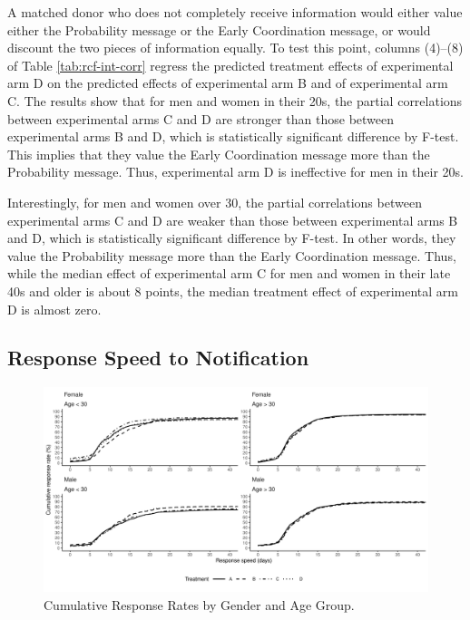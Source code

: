\documentclass[
]{article}
\begin{document}
A matched donor who does not completely receive information would either value either the Probability message or the Early Coordination message, or would discount the two pieces of information equally. To test this point, columns (4)--(8) of Table \ref{tab:rcf-int-corr} regress the predicted treatment effects of experimental arm D on the predicted effects of experimental arm B and of experimental arm C. The results show that for men and women in their 20s, the partial correlations between experimental arms C and D are stronger than those between experimental arms B and D, which is statistically significant difference by F-test. This implies that they value the Early Coordination message more than the Probability message. Thus, experimental arm D is ineffective for men in their 20s.

Interestingly, for men and women over 30, the partial correlations between experimental arms C and D are weaker than those between experimental arms B and D, which is statistically significant difference by F-test. In other words, they value the Probability message more than the Early Coordination message. Thus, while the median effect of experimental arm C for men and women in their late 40s and older is about 8 points, the median treatment effect of experimental arm D is almost zero.

\hypertarget{reply-speed}{%
\subsection{Response Speed to Notification}\label{reply-speed}}

\begin{figure}[t]
\includegraphics{robustness-body_files/figure-latex/cumulative-response-rate-1} \caption{Cumulative Response Rates by Gender and Age Group.}\label{fig:cumulative-response-rate}
\end{figure}
\end{document}
